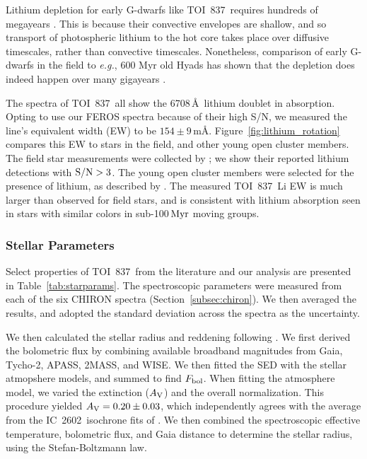 \documentclass[12pt,twocolumn,tighten]{aastex63}
\newcommand{\tn}{TOI~837} %
\newcommand{\cn}{IC~2602} %
\begin{document}
Lithium depletion for early G-dwarfs like \tn\ requires hundreds of
megayears \citep{soderblom_ages_2014}. This is because their
convective envelopes are shallow, and so transport of photospheric
lithium to the hot core takes place over diffusive timescales, rather
than convective timescales.  Nonetheless, comparison of early G-dwarfs
in the field to {\it e.g.}, 600 Myr old Hyads has shown that the
depletion does indeed happen over many gigayears
\citep{berger_identifying_2018}.

The spectra of \tn\ all show the 6708$\,$\AA\ lithium doublet in
absorption. Opting to use our FEROS spectra because of their high S/N,
we measured the line's equivalent width (EW) to be $154 \pm 9 \,
$m\AA.  Figure~\ref{fig:lithium_rotation} compares this EW to stars in
the field, and other young open cluster members.  The field star
measurements were collected by \citet{berger_identifying_2018}; we
show their reported lithium detections with ${\rm S/N}>3$.  The young
open cluster members were selected for the presence of lithium, as
described by \citet{randich_gaiaeso_2018}.  The measured \tn\ Li EW is
much larger than observed for field stars, and is consistent with
lithium absorption seen in stars with similar colors in sub-100$\,{\rm
Myr}$ moving groups.


\subsubsection{Stellar Parameters}
\label{subsec:starparams}




Select properties of \tn\ from the literature and our analysis are
presented in Table~\ref{tab:starparams}.  The spectroscopic parameters
were measured from each of the six CHIRON spectra
(Section~\ref{subsec:chiron}). We then averaged the results, and
adopted the standard deviation across the spectra as the uncertainty.

We then calculated the stellar radius and reddening following
\citet{stassun_accurate_2017}.  We first derived the bolometric flux
by combining available broadband magnitudes from Gaia, Tycho-2, APASS,
2MASS, and WISE.  We then fitted the SED with the
\citet{kurucz_atlas12_2013} stellar atmopshere models, and summed to
find $F_{\rm bol}$.  When fitting the atmosphere model, we varied the
extinction ($A_{\rm V}$) and the overall normalization.  This
procedure yielded $A_{\rm V} = 0.20\pm0.03$, which independently
agrees with the average from the \cn\ isochrone fits of
\citet{randich_gaiaeso_2018}.
We then combined the spectroscopic effective temperature, bolometric
flux, and Gaia distance to determine the stellar radius, using the
Stefan-Boltzmann law.
\end{document}
